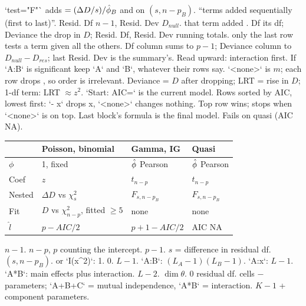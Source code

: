\li`test="F"` adds  $=(\Delta D/s)/\hat{\phi}_B$ and  on $(s,n-p_B)$.
\sk{} “terms added sequentially (first to last)”.
\li{} Resid. Df $n-1$, Resid. Dev $D_{null}$.
\li{} that term added . Df its df; Deviance the drop in $D$; Resid. Df, Resid. Dev running totals.
\li{} only the last row tests a term given all the others.
\li{} Df column sums to $p-1$; Deviance column to $D_{null}-D_{res}$; last Resid. Dev is the summary's.
\li Read upward: interaction first. If `A:B` is significant keep `A` and `B`, whatever their rows say.
\sk{} `<none>` is $m$; each row drops , so order is irrelevant. Deviance = $D$ after dropping; LRT = rise in $D$; 1-df term: LRT $\approx z^2$.
\sk{} `Start: AIC=` is the current model. Rows sorted by AIC, lowest first: `- x` drops x, `<none>` changes nothing. Top row wins; stops when `<none>` is on top. Last block's formula is the final model. Fails on quasi (AIC NA).
\bx
{}\par
{\renewcommand{\arraystretch}{1.08}%
\begin{tabular}{@{}|p{22pt}|p{42pt}|p{33pt}|p{28pt}|@{}}\hline
\rowcolor{hdr}&Poisson, binomial&Gamma, IG&Quasi\\\hline
$\phi$&1, fixed&$\hat{\phi}$ Pearson&$\hat{\phi}$ Pearson\\\hline
Coef&$z$&$t_{n-p}$&$t_{n-p}$\\\hline
Nested&$\Delta D$ vs $\chi^2_s$&$F_{s,n-p_B}$&$F_{s,n-p_B}$\\\hline
Fit&$D$ vs $\chi^2_{n-p}$, fitted $\ge5$&none&none\\\hline
$\hat l$&$p-AIC/2$&$p{+}1-AIC/2$&AIC NA\\\hline
\end{tabular}}
\bx
{}  $n-1$.  $n-p$, $p$ counting the intercept.  $p-1$.  $s$ = difference in residual df.  $(s,n-p_B)$.  or `I(x^2)`: 1.  0.  $L-1$.  `A:B`: $(L_A-1)(L_B-1)$.  `A:x`: $L-1$. `A*B`: main effects plus interaction.  $L-2$.  $\dim\theta$.  0 residual df.  cells $-$ parameters; `A+B+C` = mutual independence, `A*B` = interaction.  $K-1$ + component parameters.

